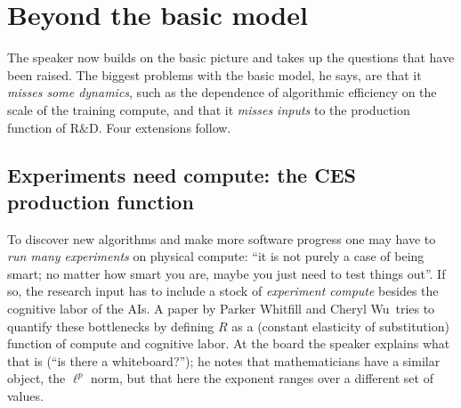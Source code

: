 
\section{Beyond the basic model}\label{sec:L4-extend}
The speaker now builds on the basic picture and takes up the questions that have been raised. The biggest problems with the basic model, he says, are that it \emph{misses some dynamics}, such as the dependence of algorithmic efficiency on the scale of the training compute, and that it \emph{misses inputs} to the production function of R\&D. Four extensions follow.

\subsection{Experiments need compute: the CES production function}\label{sec:L4-ces}
To discover new algorithms and make more software progress one may have to \emph{run many experiments} on physical compute: ``it is not purely a case of being smart; no matter how smart you are, maybe you just need to test things out''. If so, the research input has to include a stock of \emph{experiment compute} besides the cognitive labor of the AIs. A paper by Parker Whitfill and Cheryl Wu\,\citep{whitfill2025} tries to quantify these bottlenecks by defining $R$ as a  (constant elasticity of substitution) function of compute and cognitive labor. At the board the speaker explains what that is (``is there a whiteboard?''); he notes that mathematicians have a similar object, the $\ell^p$ norm, but that here the exponent ranges over a different set of values.

